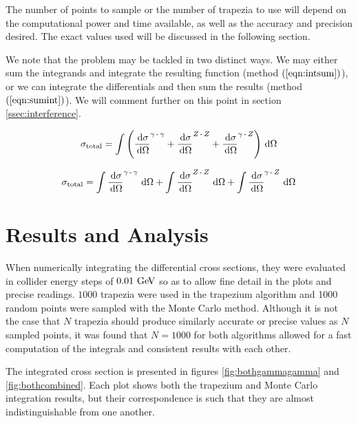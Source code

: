 \documentclass[]{article}
\begin{document}
The number of points to sample or the number of trapezia to use will depend on the computational power and time available, as well as the accuracy and precision desired. The exact values used will be discussed in the following section.

We note that the problem may be tackled in two distinct ways. We may either sum the integrands and integrate the resulting function (method $(\ref{eqn:intsum})$), or we can integrate the differentials and then sum the results (method $(\ref{eqn:sumint})$). We will comment further on this point in section \ref{ssec:interference}.

\begin{equation}\label{eqn:intsum}
\sigma_{\mathrm{total}} =
	\int \left ( \frac{\,\operatorname{d}\!{\sigma}}{\,\operatorname{d}\!{\Omega}}^{\gamma\operatorname{-}\gamma}
	+ \frac{\,\operatorname{d}\!{\sigma}}{\,\operatorname{d}\!{\Omega}}^{Z \operatorname{-}Z }
	+ \frac{\,\operatorname{d}\!{\sigma}}{\,\operatorname{d}\!{\Omega}}^{\gamma\operatorname{-}Z }
	\right )
	\,\operatorname{d}\!{\Omega}
\end{equation}

\begin{equation}\label{eqn:sumint}
\sigma_{\mathrm{total}} =
	\int \frac{\d{\sigma}}{\d{\Omega}}^{\gamma\operatorname{-}\gamma}\d{\Omega}
	+ \int \frac{\d{\sigma}}{\d{\Omega}}^{\Zzero\operatorname{-}\Zzero}\d{\Omega}
	+ \int \frac{\d{\sigma}}{\d{\Omega}}^{\gamma\operatorname{-}\Zzero}\d{\Omega}
\end{equation}


\section{Results and Analysis}\label{sec:results}

When numerically integrating the differential cross sections, they were evaluated in collider energy steps of $0.01\GeV$ so as to allow fine detail in the plots and precise readings. $1000$ trapezia were used in the trapezium algorithm and 1000 random points were sampled with the Monte Carlo method. Although it is not the case that $N$ trapezia should produce similarly accurate or precise values as $N$ sampled points, it was found that $N=1000$ for both algorithms allowed for a fast computation of the integrals and consistent results with each other.

The integrated cross section is presented in figures \ref{fig:bothgammagamma} and \ref{fig:bothcombined}. Each plot shows both the trapezium and Monte Carlo integration results, but their correspondence is such that they are almost indistinguishable from one another.
\end{document}
